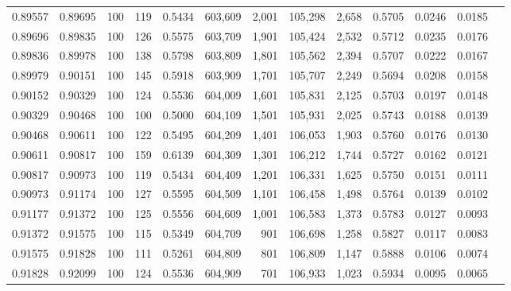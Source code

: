 \begin{tabular}{rrrrrrrrrrrrr}
0.89557 & 0.89695 &   100 & 119 &                                     0.5434 & 603,609 &   2,001 & 105,298 &   2,658 & 0.5705 & 0.0246 & 0.0185 \\
0.89696 & 0.89835 &   100 & 126 &                                     0.5575 & 603,709 &   1,901 & 105,424 &   2,532 & 0.5712 & 0.0235 & 0.0176 \\
0.89836 & 0.89978 &   100 & 138 &                                     0.5798 & 603,809 &   1,801 & 105,562 &   2,394 & 0.5707 & 0.0222 & 0.0167 \\
0.89979 & 0.90151 &   100 & 145 &                                     0.5918 & 603,909 &   1,701 & 105,707 &   2,249 & 0.5694 & 0.0208 & 0.0158 \\
0.90152 & 0.90329 &   100 & 124 &                                     0.5536 & 604,009 &   1,601 & 105,831 &   2,125 & 0.5703 & 0.0197 & 0.0148 \\
0.90329 & 0.90468 &   100 & 100 &                                     0.5000 & 604,109 &   1,501 & 105,931 &   2,025 & 0.5743 & 0.0188 & 0.0139 \\
0.90468 & 0.90611 &   100 & 122 &                                     0.5495 & 604,209 &   1,401 & 106,053 &   1,903 & 0.5760 & 0.0176 & 0.0130 \\
0.90611 & 0.90817 &   100 & 159 &                                     0.6139 & 604,309 &   1,301 & 106,212 &   1,744 & 0.5727 & 0.0162 & 0.0121 \\
0.90817 & 0.90973 &   100 & 119 &                                     0.5434 & 604,409 &   1,201 & 106,331 &   1,625 & 0.5750 & 0.0151 & 0.0111 \\
0.90973 & 0.91174 &   100 & 127 &                                     0.5595 & 604,509 &   1,101 & 106,458 &   1,498 & 0.5764 & 0.0139 & 0.0102 \\
0.91177 & 0.91372 &   100 & 125 &                                     0.5556 & 604,609 &   1,001 & 106,583 &   1,373 & 0.5783 & 0.0127 & 0.0093 \\
0.91372 & 0.91575 &   100 & 115 &                                     0.5349 & 604,709 &     901 & 106,698 &   1,258 & 0.5827 & 0.0117 & 0.0083 \\
0.91575 & 0.91828 &   100 & 111 &                                     0.5261 & 604,809 &     801 & 106,809 &   1,147 & 0.5888 & 0.0106 & 0.0074 \\
0.91828 & 0.92099 &   100 & 124 &                                     0.5536 & 604,909 &     701 & 106,933 &   1,023 & 0.5934 & 0.0095 & 0.0065 \\

\end{tabular}
